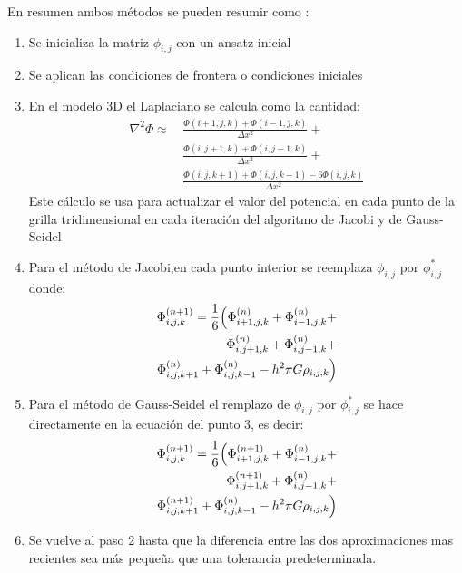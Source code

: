 \documentclass[reprint,amsmath,amssymb,aps]{revtex4-1}
\begin{document}
En resumen ambos métodos se pueden resumir como \cite{laplacian}:
\begin{enumerate}
    \item Se inicializa la matriz $\phi_{i,j}$ con un ansatz inicial
    \item Se aplican las condiciones de frontera o condiciones iniciales
     \item En el modelo 3D el Laplaciano se calcula como la cantidad:
    \begin{equation}
    \begin{split}
    \nabla^2 \Phi \approx \, & \frac{\Phi(i+1, j, k) + \Phi(i-1, j, k)}{\Delta x^2} + \\
                         & \frac{\Phi(i, j+1, k) + \Phi(i, j-1, k)}{\Delta x^2} + \\
                         & \frac{\Phi(i, j, k+1) + \Phi(i, j, k-1) - 6\Phi(i, j, k)}{\Delta x^2}
    \end{split}
    \end{equation}
    Este cálculo se usa para actualizar el valor del potencial en cada punto de la grilla tridimensional en cada iteración del algoritmo de Jacobi y de Gauss-Seidel
    \item Para el método de Jacobi,en cada punto interior se reemplaza $\phi_{i,j}$ por $\phi^*_{i,j}$ donde:
    \begin{equation}\label{Jacobi}
    \begin{split}
    \Phi_{i,j,k}^{(n+1)} = \frac{1}{6} \Bigl( \Phi_{i+1,j,k}^{(n)} + \Phi_{i-1,j,k}^{(n)} + \\
    \Phi_{i,j+1,k}^{(n)} + \Phi_{i,j-1,k}^{(n)} + \\ \Phi_{i,j,k+1}^{(n)} + \Phi_{i,j,k-1}^{(n)} - h^2 \pi G \rho_{i,j,k} \Bigr)
    \end{split}
    \end{equation}

    \item Para el método de Gauss-Seidel el remplazo de $\phi_{i,j}$ por $\phi^*_{i,j}$ se hace directamente en la ecuación del punto 3, es decir:
    \begin{equation}\label{Gauss}
    \begin{split}
        \Phi_{i,j,k}^{(n+1)} = \frac{1}{6} \Bigl( \Phi_{i+1,j,k}^{(n+1)} + \Phi_{i-1,j,k}^{(n)} + \\
    \Phi_{i,j+1,k}^{(n+1)} + \Phi_{i,j-1,k}^{(n)} + \\ \Phi_{i,j,k+1}^{(n+1)} + \Phi_{i,j,k-1}^{(n)} - h^2 \pi G \rho_{i,j,k} \Bigr)
    \end{split}
    \end{equation}
    
    \item Se vuelve al paso 2 hasta que la diferencia entre las dos aproximaciones mas recientes sea más pequeña que una tolerancia predeterminada.
\end{enumerate}
\end{document}
